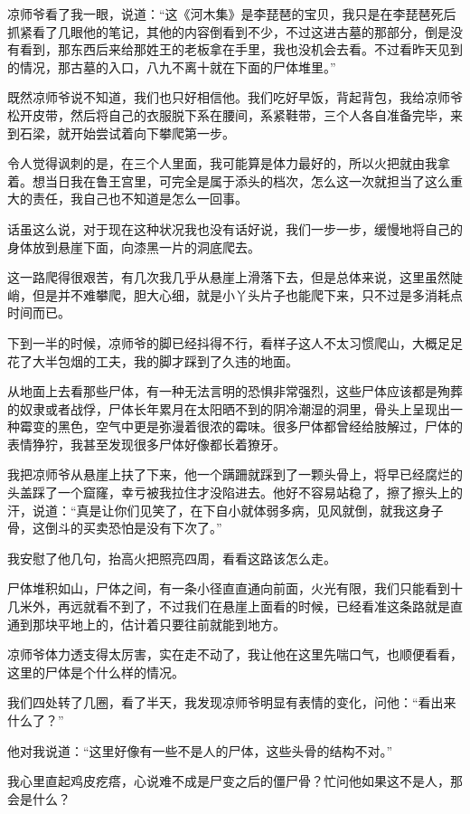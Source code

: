 凉师爷看了我一眼，说道：“这《河木集》是李琵琶的宝贝，我只是在李琵琶死后抓紧看了几眼他的笔记，其他的内容倒看到不少，不过这进古墓的那部分，倒是没有看到，那东西后来给那姓王的老板拿在手里，我也没机会去看。不过看昨天见到的情况，那古墓的入口，八九不离十就在下面的尸体堆里。”

既然凉师爷说不知道，我们也只好相信他。我们吃好早饭，背起背包，我给凉师爷松开皮带，然后将自己的衣服脱下系在腰间，系紧鞋带，三个人各自准备完毕，来到石梁，就开始尝试着向下攀爬第一步。

令人觉得讽刺的是，在三个人里面，我可能算是体力最好的，所以火把就由我拿着。想当日我在鲁王宫里，可完全是属于添头的档次，怎么这一次就担当了这么重大的责任，我自己也不知道是怎么一回事。

话虽这么说，对于现在这种状况我也没有话好说，我们一步一步，缓慢地将自己的身体放到悬崖下面，向漆黑一片的洞底爬去。

这一路爬得很艰苦，有几次我几乎从悬崖上滑落下去，但是总体来说，这里虽然陡峭，但是并不难攀爬，胆大心细，就是小丫头片子也能爬下来，只不过是多消耗点时间而已。

下到一半的时候，凉师爷的脚已经抖得不行，看样子这人不太习惯爬山，大概足足花了大半包烟的工夫，我的脚才踩到了久违的地面。

从地面上去看那些尸体，有一种无法言明的恐惧非常强烈，这些尸体应该都是殉葬的奴隶或者战俘，尸体长年累月在太阳晒不到的阴冷潮湿的洞里，骨头上呈现出一种霉变的黑色，空气中更是弥漫着很浓的霉味。很多尸体都曾经给肢解过，尸体的表情狰狞，我甚至发现很多尸体好像都长着獠牙。

我把凉师爷从悬崖上扶了下来，他一个蹒跚就踩到了一颗头骨上，将早已经腐烂的头盖踩了一个窟窿，幸亏被我拉住才没陷进去。他好不容易站稳了，擦了擦头上的汗，说道：“真是让你们见笑了，在下自小就体弱多病，见风就倒，就我这身子骨，这倒斗的买卖恐怕是没有下次了。”

我安慰了他几句，抬高火把照亮四周，看看这路该怎么走。

尸体堆积如山，尸体之间，有一条小径直直通向前面，火光有限，我们只能看到十几米外，再远就看不到了，不过我们在悬崖上面看的时候，已经看准这条路就是直通到那块平地上的，估计着只要往前就能到地方。

凉师爷体力透支得太厉害，实在走不动了，我让他在这里先喘口气，也顺便看看，这里的尸体是个什么样的情况。

我们四处转了几圈，看了半天，我发现凉师爷明显有表情的变化，问他：“看出来什么了？”

他对我说道：“这里好像有一些不是人的尸体，这些头骨的结构不对。”

我心里直起鸡皮疙瘩，心说难不成是尸变之后的僵尸骨？忙问他如果这不是人，那会是什么？

